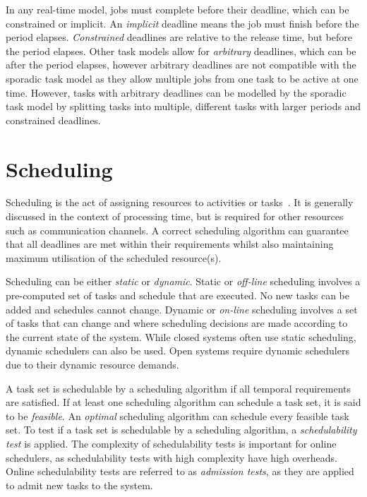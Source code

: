 In any real-time model, jobs must complete before their deadline, which can be constrained or implicit.
An \emph{implicit} deadline means the job must finish before the period elapses.
\emph{Constrained} deadlines are relative to the release time, but before the period elapses.
Other task models allow for \emph{arbitrary} deadlines, which can be after the period elapses, however arbitrary deadlines are not compatible with the sporadic task model as they allow multiple jobs from one task to be active at one time.
However, tasks with arbitrary deadlines can be modelled by the sporadic task model by splitting tasks into multiple, different tasks with larger periods and constrained deadlines.

\section{Scheduling}
\label{sec:rt-scheduling}

Scheduling is the act of assigning resources to activities or tasks~\citep{Baruah_CPV_1996}.
It is generally discussed in the context of processing time, but is required for other resources such as communication channels.
A correct scheduling algorithm  can guarantee that all deadlines are met within their requirements whilst also maintaining maximum utilisation of the scheduled resource(s).

Scheduling can be either \emph{static} or \emph{dynamic}.
Static or \emph{off-line} scheduling involves a pre-computed set of tasks and schedule that are executed.
No new tasks can be added and schedules cannot change.
Dynamic or \emph{on-line} scheduling involves a set of tasks that can change and where scheduling decisions are made according to the current state of the system.
While closed systems often use static scheduling, dynamic schedulers can also be used.
Open systems require dynamic schedulers due to their dynamic resource demands.

A task set is schedulable by a scheduling algorithm if all temporal requirements are satisfied.
If at least one scheduling algorithm can schedule a task set, it is said to be \emph{feasible}.
An \emph{optimal} scheduling algorithm can schedule every feasible task set.
To test if a task set is schedulable by a scheduling algorithm, a \emph{schedulability test} is applied.
The complexity of schedulability tests is important for online schedulers, as schedulability tests with high complexity have high overheads.
Online schedulability tests are referred to as \emph{admission tests}, as they are applied to admit new tasks to the system.

